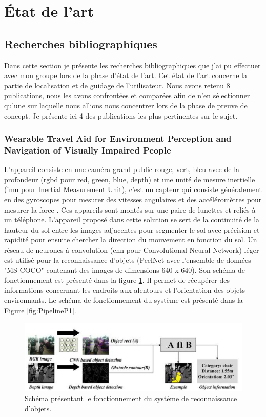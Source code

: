\documentclass[11pt]{article}
\begin{document}
  \section{État de l'art}  
  \subsection{Recherches bibliographiques}
  Dans cette section je présente les recherches bibliographiques que j'ai pu effectuer avec mon groupe lors de la phase d'état de l'art.
  Cet état de l'art concerne la partie de localisation et de guidage de l'utilisateur. Nous avons retenu 8 publications, nous les avons 
  confrontées et comparées afin de n'en sélectionner qu'une sur laquelle nous allions nous concentrer lors de la phase de preuve de 
  concept. Je présente ici 4 des publications les plus pertinentes sur le sujet.

  \subsubsection{Wearable Travel Aid for Environment Perception and Navigation of Visually Impaired People}

  L'appareil consiste en une caméra grand public rouge, vert, bleu avec de la profondeur (\acrshort{rgbd} pour red, green, blue, depth)
  et une unité de mesure inertielle (\acrshort{imu} pour Inertial Measurement Unit), c'est un capteur qui consiste généralement en des gyroscopes 
  pour mesurer des vitesses angulaires et des accéléromètres pour mesurer la force \cite{baiWearableTravelAid2019}. Ces appareils sont montés sur une paire de lunettes
  et reliés à un téléphone. L'appareil proposé dans cette solution se sert de la continuité de la hauteur du sol entre les images 
  adjacentes pour segmenter le sol avec précision et rapidité pour ensuite chercher la direction du mouvement en fonction du sol.
  Un réseau de neurones à convolution (\acrshort{cnn} pour Convolutional Neural Network) léger est utilisé pour la reconnaissance d'objets 
  (PeelNet avec l'ensemble de données "MS COCO" contenant des images de dimensions 640 x 640). Son schéma de fonctionnement est présenté 
  dans la figure \ref{fig:ReconnaissanceP1}. Il permet de récupérer des informations concernant les endroits aux alentours et l'orientation 
  des objets environnants. Le schéma de fonctionnement du système est présenté dans la Figure \ref{fig:PipelineP1}.

  \begin{figure}[hbt]  
    \includegraphics[width=\textwidth]{RecognitionP1.png}    
    \caption{Schéma présentant le fonctionnement du système de reconnaissance d'objets.}
    \label{fig:ReconnaissanceP1}
  \end{figure} 
\end{document}
